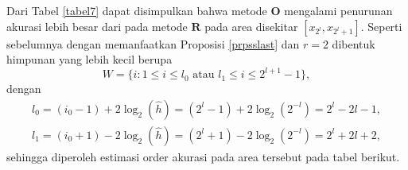     \begin{table}[htp]
        \centering
        \caption{Tabel estimasi order akurasi eksperimen kedua dengan interval sama besar $h=2^{-l}$, $5 \leq l \leq 8$, $W=\{ i : 1\leq i \leq l_0 $ atau $l_1 \leq i \leq 2^{l+1}- 1\}$, $l_0 = 2^l - l - 1$ dan $l_1 =  2^l + l + 2$}
        \label{tabel7}
    \end{table}

    Dari Tabel \ref{tabel7} dapat disimpulkan bahwa metode $\textbf{O}$ mengalami penurunan akurasi lebih besar dari pada metode $\textbf{R}$ pada area disekitar $[x_{2^{l}}, x_{2^l+1}]$. Seperti sebelumnya dengan memanfaatkan Proposisi \ref{prpsslast} dan $r=2$ dibentuk himpunan yang lebih kecil berupa 
    $$W=\{ i : 1\leq i \leq l_0 \text{ atau } l_1 \leq i \leq 2^{l+1} - 1\},$$ 
    dengan
    \begin{align*}
        l_0 = (i_0 - 1) + 2\log_2(\hat{h}) = (2^l - 1) + 2\log_2(2^{-l}) = 2^l - 2l - 1,\\
        l_1 = (i_0 + 1) - 2\log_2(\hat{h}) = (2^l + 1) - 2\log_2(2^{-l}) = 2^l + 2l + 2,
    \end{align*}
    sehingga diperoleh estimasi order akurasi pada area tersebut pada tabel berikut.
    
